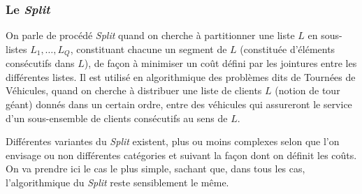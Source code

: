 \subsubsection{Le \textit{Split}}

On parle de procédé \textit{Split} quand on cherche à partitionner une liste $L$ en sous-listes $L_1, \dots, L_Q$,  constituant chacune un segment de $L$ (constituée d'éléments consécutifs dans $L$), de façon à minimiser un coût défini par les jointures entre les différentes listes. Il est utilisé en algorithmique des problèmes dits de Tournées de Véhicules, quand on cherche à distribuer une liste de clients $L$ (notion de tour géant) donnés dans un certain ordre, entre des véhicules qui assureront le service d'un sous-ensemble de clients consécutifs au sens de $L$.

Différentes variantes du \textit{Split} existent, plus ou moins complexes selon que l'on envisage ou non différentes catégories et suivant la façon dont on définit les coûts. On va prendre ici le cas le plus simple, sachant que, dans tous les cas, l'algorithmique du \textit{Split} reste sensiblement le même.

